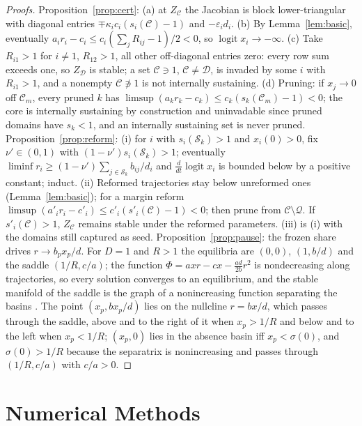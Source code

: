 \documentclass[letterpaper]{article} %
\theoremstyle{definition}
\newcommand{\cC}{\mathcal{C}}
\newcommand{\cQ}{\mathcal{Q}}
\newcommand{\cS}{\mathcal{S}}
\newcommand{\cD}{\mathcal{D}}
\begin{document}
\begin{proof}[Proofs]
Proposition~\ref{prop:cert}: (a) at $Z_\cC$ the Jacobian is block lower-triangular with diagonal entries $\mp\kappa_ic_i(s_i(\cC)-1)$ and $-\varepsilon_id_i$. (b) By Lemma~\ref{lem:basic}, eventually $a_ir_i-c_i\le c_i(\sum_jR_{ij}-1)/2<0$, so $\operatorname{logit}x_i\to-\infty$. (c) Take $R_{i1}>1$ for $i\neq1$, $R_{12}>1$, all other off-diagonal entries zero: every row sum exceeds one, so $Z_\cD$ is stable; a set $\cC\ni1$, $\cC\neq\cD$, is invaded by some $i$ with $R_{i1}>1$, and a nonempty $\cC\not\ni1$ is not internally sustaining. (d) Pruning: if $x_j\to0$ off $\cC_m$, every pruned $k$ has $\limsup(a_kr_k-c_k)\le c_k(s_k(\cC_m)-1)<0$; the core is internally sustaining by construction and uninvadable since pruned domains have $s_k<1$, and an internally sustaining set is never pruned. Proposition~\ref{prop:reform}: (i) for $i$ with $s_i(\cS_k)>1$ and $x_i(0)>0$, fix $\nu'\in(0,1)$ with $(1-\nu')s_i(\cS_k)>1$; eventually $\liminf r_i\ge(1-\nu')\sum_{j\in\cS_k}b_{ij}/d_i$ and $\frac{d}{dt}\operatorname{logit}x_i$ is bounded below by a positive constant; induct. (ii) Reformed trajectories stay below unreformed ones (Lemma~\ref{lem:basic}); for a margin reform $\limsup(a'_ir_i-c'_i)\le c'_i(s'_i(\cC)-1)<0$; then prune from $\cC\setminus\cQ$. If $s'_i(\cC)>1$, $Z_\cC$ remains stable under the reformed parameters. (iii) is (i) with the domains still captured as seed. Proposition~\ref{prop:pause}: the frozen share drives $r\to b_px_p/d$. For $D=1$ and $R>1$ the equilibria are $(0,0)$, $(1,b/d)$ and the saddle $(1/R,c/a)$; the function $\Phi=axr-cx-\frac{ad}{2b}r^2$ is nondecreasing along trajectories, so every solution converges to an equilibrium, and the stable manifold of the saddle is the graph of a nonincreasing function separating the basins \citep{hirsch1985,smith1995}. The point $(x_p,bx_p/d)$ lies on the nullcline $r=bx/d$, which passes through the saddle, above and to the right of it when $x_p>1/R$ and below and to the left when $x_p<1/R$; $(x_p,0)$ lies in the absence basin iff $x_p<\sigma(0)$, and $\sigma(0)>1/R$ because the separatrix is nonincreasing and passes through $(1/R,c/a)$ with $c/a>0$.
\end{proof}

\section{Numerical Methods}\label{app:numerics}
\end{document}
